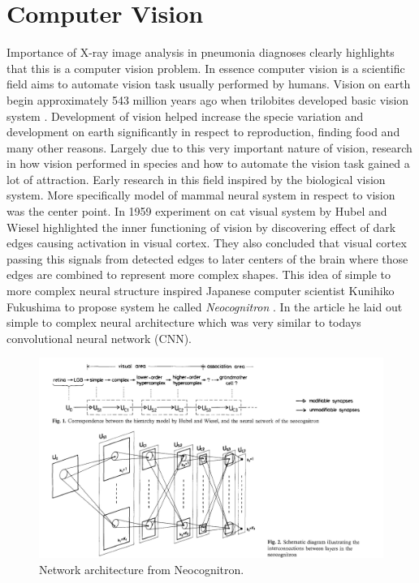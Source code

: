 \documentclass[12pt, twoside, a4paper]{article}
\begin{document}
\section{Computer Vision}
Importance of X-ray image analysis in pneumonia diagnoses clearly highlights that this is a computer vision problem. In essence computer vision is a scientific field aims to automate vision task usually performed by humans. Vision on earth begin approximately 543 million years ago when trilobites developed basic vision system \cite{firstvision}. Development of vision helped increase the specie variation and development on earth significantly in respect to reproduction, finding food and many other reasons. Largely due to this very important nature of vision, research in how vision performed in species and how to automate the vision task gained a lot of attraction. Early research in this field inspired by the biological vision system. More specifically model of mammal neural system in respect to vision was the center point. In 1959 experiment on cat visual system by Hubel and Wiesel \cite{hubel:single} highlighted the inner functioning of vision by discovering effect of dark edges causing activation in visual cortex. They also concluded that visual cortex passing this signals from detected edges to later centers of the brain where those edges are combined to represent more complex shapes. This idea of simple to more complex neural structure inspired Japanese computer scientist Kunihiko Fukushima to propose system he called \textit{Neocognitron} \cite{fukushima:neocognitronbc}. In the article he laid out simple to complex neural architecture which was very similar to todays convolutional neural network (CNN).

\begin{figure}[H]%
    \centering
    \includegraphics[width=\textwidth]{img/fukushima.png}%
    \caption{Network architecture from Neocognitron.}%
    \label{fig:neocognitron}%
\end{figure}
\end{document}

